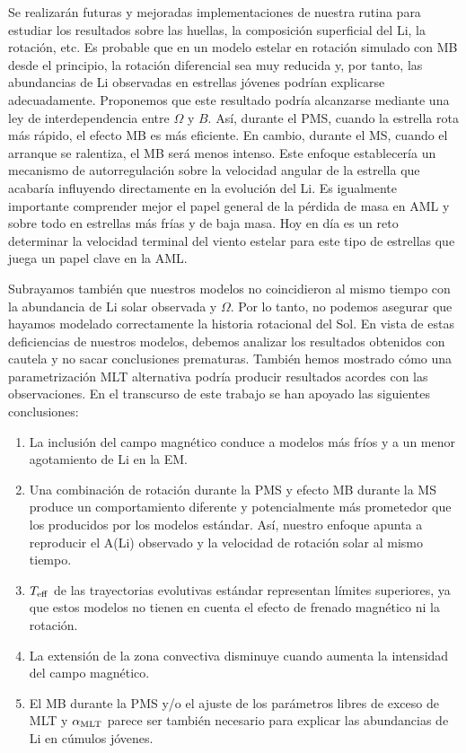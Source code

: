 Se realizarán futuras y mejoradas implementaciones de nuestra rutina para estudiar los resultados sobre las huellas, la composición superficial del Li, la rotación, etc. Es probable que en un modelo estelar en rotación simulado con MB desde el principio, la rotación diferencial sea muy reducida y, por tanto, las abundancias de Li observadas en estrellas jóvenes podrían explicarse adecuadamente. Proponemos que este resultado podría alcanzarse mediante una ley de interdependencia entre $\Omega$ y $B$. Así, durante el PMS, cuando la estrella rota más rápido, el efecto MB es más eficiente. En cambio, durante el MS, cuando el arranque se ralentiza, el MB será menos intenso. Este enfoque establecería un mecanismo de autorregulación sobre la velocidad angular de la estrella que acabaría influyendo directamente en la evolución del Li. Es igualmente importante comprender mejor el papel general de la pérdida de masa en AML y sobre todo en estrellas más frías y de baja masa. Hoy en día es un reto determinar la velocidad terminal del viento estelar para este tipo de estrellas que juega un papel clave en la AML.\par

Subrayamos también que nuestros modelos no coincidieron al mismo tiempo con la abundancia de Li solar observada y $\Omega$. Por lo tanto, no podemos asegurar que hayamos modelado correctamente la historia rotacional del Sol. En vista de estas deficiencias de nuestros modelos, debemos analizar los resultados obtenidos con cautela y no sacar conclusiones prematuras. También hemos mostrado cómo una parametrización MLT alternativa podría producir resultados acordes con las observaciones. En el transcurso de este trabajo se han apoyado las siguientes conclusiones:
\begin{enumerate}
	\item La inclusión del campo magnético conduce a modelos más fríos y a un menor agotamiento de Li en la EM.
	\item Una combinación de rotación durante la PMS y efecto MB durante la MS produce un comportamiento diferente y potencialmente más prometedor que los producidos por los modelos estándar. Así, nuestro enfoque apunta a reproducir el A(Li) observado y la velocidad de rotación solar al mismo tiempo.
	\item $T_{\mathrm{eff}}$ de las trayectorias evolutivas estándar representan límites superiores, ya que estos modelos no tienen en cuenta el efecto de frenado magnético ni la rotación.
	\item La extensión de la zona convectiva disminuye cuando aumenta la intensidad del campo magnético.
	\item El MB durante la PMS y/o el ajuste de los parámetros libres de exceso de MLT y $\alpha_{\mathrm{MLT}}$ parece ser también necesario para explicar las abundancias de Li en cúmulos jóvenes.
\end{enumerate}

\endinput
